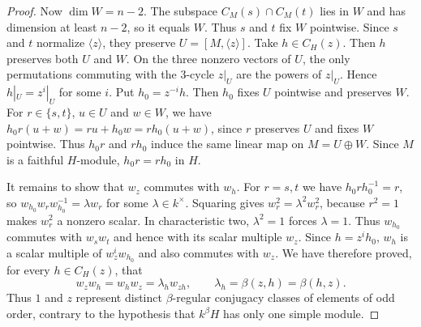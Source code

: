 \documentclass[11pt,a4paper]{article}
\theoremstyle{definition}
\theoremstyle{remark}
\numberwithin{equation}{section}
\begin{document}
\begin{proof}
		Now $\dim W=n-2$. The subspace $C_M(s)\cap C_M(t)$ lies in $W$
		and has dimension at least $n-2$, so it equals $W$. Thus $s$ and $t$
		fix $W$ pointwise. Since $s$ and $t$ normalize $\langle z\rangle$,
		they preserve $U=[M,\langle z\rangle]$.
		Take $h\in C_H(z)$. Then $h$ preserves both $U$ and $W$. On the three
		nonzero vectors of $U$, the only permutations commuting with the $3$-cycle
		$z|_U$ are the powers of $z|_U$.
		Hence $h|_U=z^i|_U$ for some $i$. Put $h_0=z^{-i}h$. Then $h_0$
		fixes $U$ pointwise and preserves $W$. For $r\in\{s,t\}$, $u\in U$
		and $w\in W$, we have $h_0r(u+w)=ru+h_0w=rh_0(u+w)$, since $r$
		preserves $U$ and fixes $W$ pointwise. Thus $h_0r$ and $rh_0$ induce
		the same linear map on $M=U\oplus W$. Since $M$ is a faithful $H$-module,
		$h_0r=rh_0$ in $H$.
		
		It remains to show that $w_z$ commutes with $w_h$. For $r=s,t$ we have
		$h_0rh_0^{-1}=r$, so $w_{h_0}w_rw_{h_0}^{-1}=\lambda w_r$ for some
		$\lambda\in k^\times$. Squaring gives $w_r^2=\lambda^2w_r^2$,
		because $r^2=1$ makes $w_r^2$ a nonzero scalar. In characteristic two,
		$\lambda^2=1$ forces $\lambda=1$. Thus $w_{h_0}$ commutes with
		$w_sw_t$ and hence with its scalar multiple $w_z$. Since $h=z^ih_0$,
		$w_h$ is a scalar multiple of $w_z^i w_{h_0}$ and also commutes with
		$w_z$. We have therefore proved, for every $h\in C_H(z)$, that
		\[
		w_z w_h=w_h w_z=\lambda_h w_{zh},\qquad
		\lambda_h=\beta(z,h)=\beta(h,z).
		\]
		Thus $1$ and $z$ represent distinct $\beta$-regular conjugacy
		classes of elements of odd order, contrary to the hypothesis that $k^\beta H$ has
		only one simple module.
	\end{proof}
	
\end{document}
